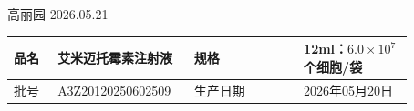 \documentclass[UTF8,10pt,a4paper,fontset=fandol]{ctexart}
\newcommand{\fieldvalue}[1]{#1}
\newcommand{\handwritten}[1]{#1}
\begin{document}
\handwritten{高丽园}\quad
\handwritten{2026.05.21}

\newpage

\begin{center}
\small
\begin{tabular}{|p{0.10\linewidth}|p{0.27\linewidth}|p{0.25\linewidth}|p{0.25\linewidth}|}
\hline
品名 &
\fieldvalue{艾米迈托霉素注射液} &
规格 &
\fieldvalue{12ml：$6.0\times10^{7}$个细胞/袋}
\\ \hline
批号 &
\fieldvalue{A3Z20120250602509} &
生产日期 &
\fieldvalue{2026年05月20日}
\\ \hline
\end{tabular}

\vspace{0pt}


\end{center}
\end{document}
